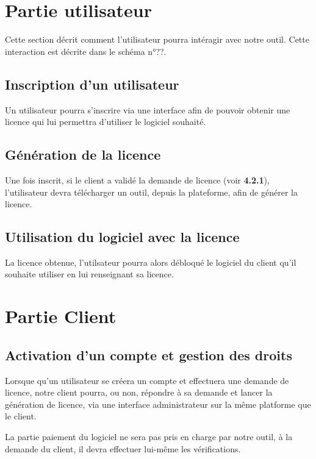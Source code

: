 \section{Partie utilisateur}

Cette section décrit comment l'utilisateur pourra intéragir avec notre outil. Cette interaction est décrite dans le schéma n°??.

\subsection{Inscription d'un utilisateur}

Un utilisateur pourra s'inscrire via une interface afin de pouvoir obtenir une licence qui lui permettra d'utiliser le logiciel souhaité. 

\subsection{Génération de la licence}

Une fois inscrit, si le client a validé la demande de licence (voir \textbf{4.2.1}), l'utilisateur devra télécharger un outil, depuis la
plateforme, afin de générer la licence.

\subsection{Utilisation du logiciel avec la licence}

La licence obtenue, l'utilsateur pourra alors débloqué le logiciel du client qu'il souhaite utiliser en lui renseignant
sa licence.

\section{Partie Client}

\subsection{Activation d'un compte et gestion des droits}

Lorsque qu'un utilisateur se créera un compte et effectuera une demande de licence, notre client pourra, ou non, répondre
à sa demande et lancer la génération de licence, via une interface administrateur sur la même platforme que le client.

La partie paiement du logiciel ne sera pas pris en charge par notre outil, à la demande du client,
il devra effectuer lui-même les vérifications.